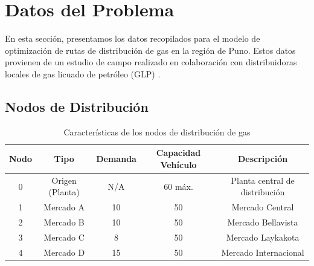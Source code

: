 \documentclass[11pt, a4paper]{article}
\begin{document}
\section{Datos del Problema}
En esta sección, presentamos los datos recopilados para el modelo de optimización de rutas de distribución de gas en la región de Puno. Estos datos provienen de un estudio de campo realizado en colaboración con distribuidoras locales de gas licuado de petróleo (GLP) \citep{OrozcoGutierrez2018}.

\subsection{Nodos de Distribución}
\begin{table}[H]
\centering
\begin{tabular}{|c|c|c|c|c|}
\hline
\textbf{Nodo} & \textbf{Tipo} & \textbf{Demanda} & \textbf{Capacidad Vehículo} & \textbf{Descripción} \\
\hline
0 & Origen (Planta) & N/A & 60 máx. & Planta central de distribución \\
\hline
1 & Mercado A & 10 & 50 & Mercado Central \\
\hline
2 & Mercado B & 10 & 50 & Mercado Bellavista \\
\hline
3 & Mercado C & 8 & 50 & Mercado Laykakota \\
\hline
4 & Mercado D & 15 & 50 & Mercado Internacional \\
\hline
\end{tabular}
\caption{Características de los nodos de distribución de gas}
\label{tab:nodos_distribucion}
\end{table}
\end{document}
